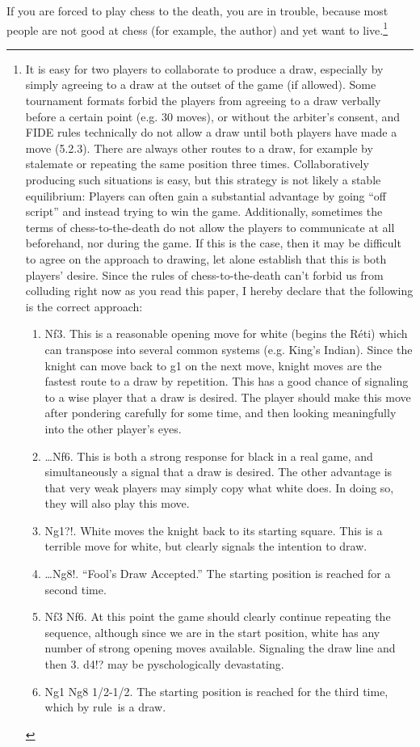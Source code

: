 \documentclass[twocolumn]{article}
\begin{document}
If you are forced to play chess to the death, you are in trouble,
because most people are not good at chess (for example, the author)
and yet want to live.\footnote{It is easy for two players to
  collaborate to produce a draw, especially by simply agreeing to a
  draw at the outset of the game (if allowed). Some tournament formats
  forbid the players from agreeing to a draw verbally before a certain
  point (e.g. 30 moves), or without the arbiter's consent, and FIDE
  rules technically do not allow a draw until both players have made a
  move (5.2.3). There are always other routes to a draw, for example
  by stalemate or repeating the same position three times.
  Collaboratively producing such situations is easy, but this strategy
  is not likely a stable equilibrium: Players can often gain a
  substantial advantage by going ``off script'' and instead trying to
  win the game. Additionally, sometimes the terms of
  chess-to-the-death do not allow the players to communicate at all
  beforehand, nor during the game. If this is the case, then it may be
  difficult to agree on the approach to drawing, let alone establish
  that this is both players' desire. Since the rules of
  chess-to-the-death can't forbid us from colluding right now as you
  read this paper, I hereby declare that the following is the correct
  approach:
\begin{enumerate}[label=\arabic*.]
  \item[1.] Nf3. This is a reasonable opening move for white (begins the R\'eti)
    which can transpose into several common systems (e.g. King's
    Indian). Since the knight can move back to g1 on the next move,
    knight moves are the fastest route to a draw by repetition. This
    has a good chance of signaling to a wise player that a draw is
    desired. The player should make this move after pondering carefully
    for some time, and then looking meaningfully into the other player's
    eyes. 
  \item[1.] \ldots Nf6. This is both a strong response for black in a real game,
    and simultaneously a signal that a draw is desired. The other
    advantage is that very weak players\cite{eloworld} may simply copy what white does.
    In doing so, they will also play this move. 
  \item[2.] Ng1?!. White moves the knight back to its starting square.
    This is a terrible move for white, but clearly signals the intention to
    draw.
  \item[2.] \ldots Ng8!. ``Fool's Draw Accepted.'' The starting position is reached
    for a second time.
  \item[3.] Nf3 Nf6. At this point the game should clearly continue repeating
    the sequence, although since we are in the start position, white has
    any number of strong opening moves available. Signaling the draw line
    and then 3. d4!? may be pyschologically devastating.
  \item[4.] Ng1 Ng8 1/2-1/2. The starting position is reached for the third
    time, which by rule\footnotemark\ is a draw.
\end{enumerate}

}
\end{document}
